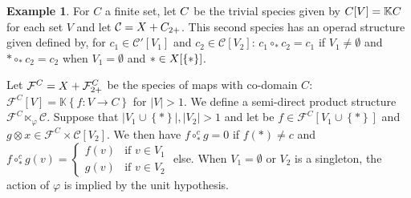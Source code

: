 \documentclass[11pt]{article}
\theoremstyle{definition}
\newtheorem{exam}[theo]{Example}
\numberwithin{equation}{section}
\newcommand{\noemp}{\not = \emptyset}
\newcommand{\set}[1]{\left\{#1\right\}}
\newcommand{\spe}[1]{\normalfont{\textsc{#1}}}
\newcommand{\card}[1]{|#1|}
\newcommand{\K}{\mathbb{K}}
\newcommand{\comp}[1][\ast]{\circ_{#1}}
\begin{document}
\begin{exam}
    For $C$ a finite set, let $\spe{C}$ be the trivial species given by $\spe{C}[V]=\K C$ for each set $V$ 
    and let $\mathcal{C}=\spe{X}+\spe{C}_{2+}$. This second species has an operad structure given defined by, 
    for $c_1\in \mathcal{C}'[V_1]$ and $c_2\in \mathcal{C}[V_2]$: $c_1\comp c_2 = c_1$ if $V_1\noemp$ and 
    $\ast\comp c_2 = c_2$ when $V_1=\emptyset$ and $\ast\in\spe{X}[\set{\ast}]$. 

    Let $\mathcal{F}^C = \spe{X} + \mathcal{F}_{2+}^C$ be the species of maps with co-domain $C$: 
    $\mathcal{F}^C[V]=\K\set{f:V\to C}$ for $\card{V} > 1$. We define a semi-direct product structure 
    $\mathcal{F}^C\ltimes_{\varphi} \mathcal{C}$. Suppose that $\card{V_1\cup\set{\ast}},\card{V_2}>1$ and let 
    be $f\in \mathcal{F}^C[V_1\cup\set{\ast}]$ and $g\otimes x\in \mathcal{F}^C\times \mathcal{C}[V_2]$. We 
    then have $f\comp^c g = 0$ if $f(\ast) \not = c$ and 
    $f\comp^c g(v) = \left\{\begin{array}{rl}
    f(v)  & \text{if $v\in V_1$}    \\ 
    g(v)  & \text{if $v\in V_2$}\end{array}\right.$ 
    else. When $V_1=\emptyset$ or $V_2$ is a singleton, the action of $\varphi$ is implied by the 
    unit hypothesis. 
   

\end{exam}
\end{document}
